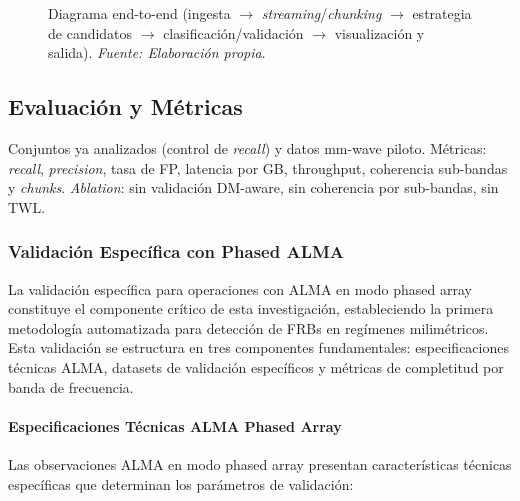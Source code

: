 \begin{figure}[H]
\caption{Diagrama end-to-end (ingesta $\to$ \emph{streaming}/\emph{chunking} $\to$ estrategia de candidatos $\to$ clasificación/validación $\to$ visualización y salida). \textit{Fuente: Elaboración propia}.}
\label{fig:pipeline-end-to-end}
\end{figure}

\subsection{Evaluación y Métricas}

Conjuntos ya analizados (control de \emph{recall}) y datos mm-wave piloto. Métricas: \emph{recall}, \emph{precision}, tasa de FP, latencia por GB, throughput, coherencia sub-bandas y \emph{chunks}. \emph{Ablation}: sin validación DM-aware, sin coherencia por sub-bandas, sin TWL.

\subsubsection{Validación Específica con Phased ALMA}

La validación específica para operaciones con ALMA en modo phased array constituye el componente crítico de esta investigación, estableciendo la primera metodología automatizada para detección de FRBs en regímenes milimétricos. Esta validación se estructura en tres componentes fundamentales: especificaciones técnicas ALMA, datasets de validación específicos y métricas de completitud por banda de frecuencia.

\paragraph{Especificaciones Técnicas ALMA Phased Array}

Las observaciones ALMA en modo phased array presentan características técnicas específicas que determinan los parámetros de validación:

